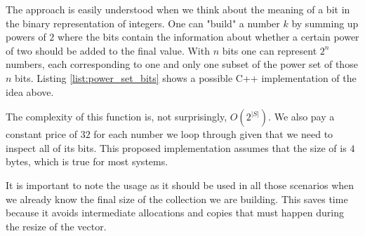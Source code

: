 The approach is easily understood when we think about the meaning of a bit in the binary representation of integers. One
can "build" a number $k$ by summing up powers of $2$ where the bits contain the information about whether a
certain power of two should be added to the final value. With $n$
bits one can represent $2^n$ numbers, each corresponding to one and only one subset of the power set of those $n$ bits.
Listing \ref{list:power_set_bits} shows  a possible C++ implementation of the idea above.




The complexity of this function is, not surprisingly, $O(2^{|S|})$. 
We also pay a constant price of $32$ for each number we loop through given that we need to inspect all of its bits.
This proposed implementation assumes that the size of  is $4$ bytes, which is true for most systems.

It is important to note the usage  as it should be used in all those scenarios when we already know the final size of the collection we are building.
This saves time because it avoids intermediate allocations and copies that must happen during the resize of the vector.








